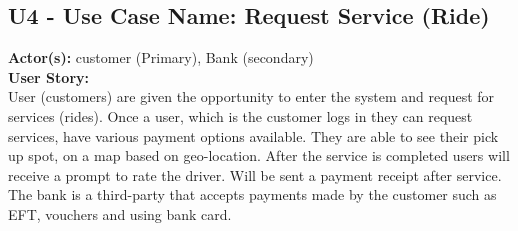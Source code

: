 \documentclass[9pt]{report}
\begin{document}
\subsection*{U4 - Use Case Name: Request Service (Ride)}
\textbf{Actor(s):} customer (Primary), Bank (secondary)
\textbf{\\User Story:}
\\User (customers) are given the opportunity to enter the system and request for services (rides). Once a user, which is the customer logs in they can request services, have various payment options available. They are able to see their pick up spot, on a map based on geo-location. After the service is completed users will receive a prompt to rate the driver. Will be sent a payment receipt after service. \\ The bank is a third-party that accepts payments made by the customer such as EFT, vouchers and using bank card.
\end{document}
